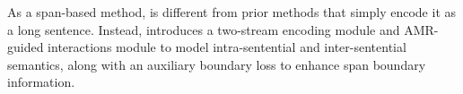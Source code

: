 As a span-based method, \modelname is different from prior methods that simply encode it as a long sentence.
Instead, \modelname introduces a two-stream encoding module and AMR-guided interactions module to model intra-sentential and inter-sentential semantics, along with an auxiliary boundary loss to enhance span boundary information.

